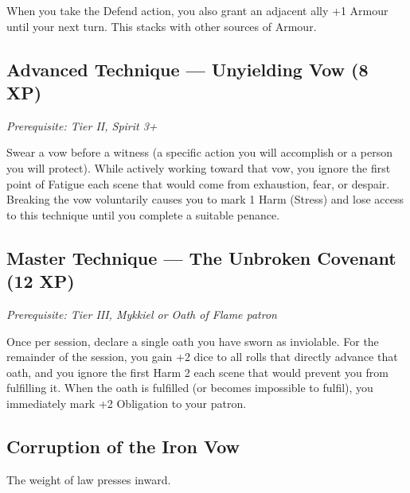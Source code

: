\documentclass[11pt]{book}
\begin{document}
When you take the Defend action, you also grant an adjacent ally +1 Armour until your next turn. This stacks with other sources of Armour.

\subsection*{Advanced Technique --- Unyielding Vow (8 XP)}
\textit{Prerequisite: Tier II, Spirit 3+}

Swear a vow before a witness (a specific action you will accomplish or a person you will protect). While actively working toward that vow, you ignore the first point of Fatigue each scene that would come from exhaustion, fear, or despair. Breaking the vow voluntarily causes you to mark 1 Harm (Stress) and lose access to this technique until you complete a suitable penance.

\subsection*{Master Technique --- The Unbroken Covenant (12 XP)}
\textit{Prerequisite: Tier III, Mykkiel or Oath of Flame patron}

Once per session, declare a single oath you have sworn as inviolable. For the remainder of the session, you gain +2 dice to all rolls that directly advance that oath, and you ignore the first Harm 2 each scene that would prevent you from fulfilling it. When the oath is fulfilled (or becomes impossible to fulfil), you immediately mark +2 Obligation to your patron.

\subsection*{Corruption of the Iron Vow}

The weight of law presses inward.
\end{document}
